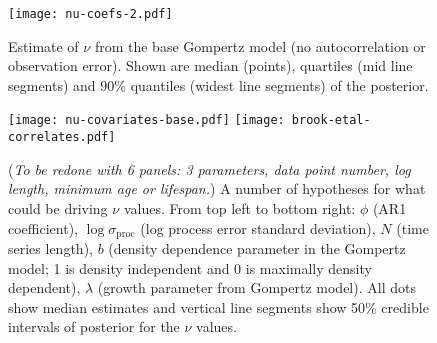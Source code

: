 \documentclass[11pt]{article}
\begin{document}
\clearpage

\begin{figure}[htbp]
\begin{center}
\texttt{[image: nu-coefs-2.pdf]}
\caption{
  Estimate of $\nu$ from the base Gompertz model (no autocorrelation or observation error).
  Shown are median (points), quartiles (mid line segments) and 90\% quantiles (widest line segments) of the posterior.}
\label{fig:nu-coefs}
\end{center}
\end{figure}

\clearpage


\clearpage

\begin{figure}[htbp]
\begin{center}
\texttt{[image: nu-covariates-base.pdf]}
\texttt{[image: brook-etal-correlates.pdf]}
\caption{
  (\textit{To be redone with 6 panels: 3 parameters, data point number, log length, minimum age or lifespan.})
  A number of hypotheses for what could be driving $\nu$ values. From top left to bottom right: $\phi$ (AR1 coefficient), $\log \sigma_\mathrm{proc}$ (log process error standard deviation), $N$ (time series length), $b$ (density dependence parameter in the Gompertz model; 1 is density independent and 0 is maximally density dependent), $\lambda$ (growth parameter from Gompertz model).  
  All dots show median estimates and vertical line segments show 50\% credible intervals of posterior for the $\nu$ values.}
\label{fig:correlates}
\end{center}
\end{figure}
\end{document}
